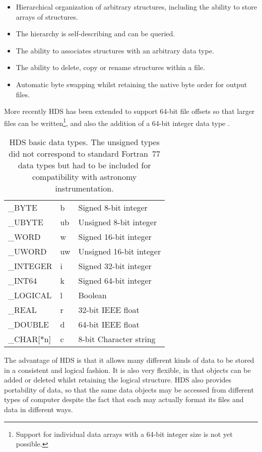 \documentclass[final,authoryear,5p,times,twocolumn]{elsarticle}
\begin{document}
\begin{itemize}
\item Hierarchical organization of arbitrary structures, including the
  ability to store arrays of structures.
\item The hierarchy is self-describing and can be queried.
\item The ability to associates structures with an arbitrary data type.
\item The ability to delete, copy or rename structures within a file.
\item Automatic byte swapping whilst retaining the native byte order
  for output files.
\end{itemize}

More recently HDS has been extended to support 64-bit file offsets so
that larger files can be written\footnote{Support for individual data
  arrays with a 64-bit integer size is not yet possible.}, and also the
addition of a 64-bit integer data type \citep{P82_adassxxiii}.

\begin{table}
\caption{HDS basic data types. The unsigned types did not correspond
  to standard Fortran~77 data types but had to be included for
  compatibility with astronomy instrumentation.}
\label{tab:hdstypes}
\begin{center}
\begin{tabular}{lll}
\hline
\_BYTE & b & Signed 8-bit integer \\
\_UBYTE & ub & Unsigned 8-bit integer \\
\_WORD & w & Signed 16-bit integer \\
\_UWORD & uw & Unsigned 16-bit integer \\
\_INTEGER & i & Signed 32-bit integer \\
\_INT64 & k &Signed 64-bit integer \\
\_LOGICAL & l & Boolean \\
\_REAL & r & 32-bit IEEE float \\
\_DOUBLE & d & 64-bit IEEE float \\
\_CHAR[$*$n] & c & 8-bit Character string \\
\hline
\end{tabular}
\end{center}
\end{table}

The advantage of HDS is that it allows many different kinds of data to
be stored in a consistent and logical fashion. It is also very
flexible, in that objects can be added or deleted whilst retaining the
logical structure. HDS also provides portability of data, so that the
same data objects may be accessed from different types of computer
despite the fact that each may actually format its files and data in
different ways.
\end{document}

